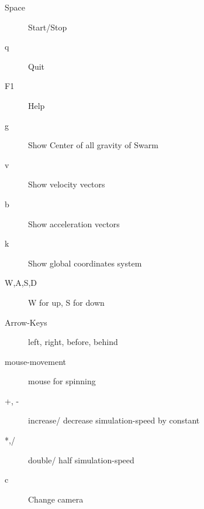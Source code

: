 \documentclass[a4paper,halfparskip,11pt,twoside]{scrartcl}
\begin{document}
\begin{description}
	\item [Space] Start/Stop
	\item [q] Quit \RSS\
	\item [F1] Help
	\item [g] Show Center of all gravity of Swarm
	\item [v] Show velocity vectors
	\item [b] Show acceleration vectors
	\item [k] Show global coordinates system
	\item [W,A,S,D] W for up, S for down
	\item [Arrow-Keys] left, right, before, behind
	\item [mouse-movement] mouse for spinning
	\item [+, -] increase/ decrease simulation-speed by constant
	\item [*,/] double/ half simulation-speed
	\item [c] Change camera
\end{description}

\appendix



\newpage
\thispagestyle{empty}
~
\end{document}
